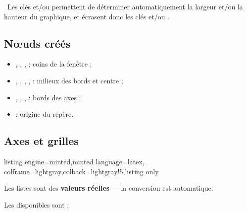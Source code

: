 \documentclass[11pt,a4paper]{ltxdoc}
\begin{document}
\smallskip

{\footnotesize\faBomb}~Les clés  et/ou  permettent de déterminer automatiquement la largeur et/ou la hauteur du graphique, et écrasent donc les clés  et/ou .

\subsection{Nœuds créés}

\begin{itemize}
	\item {}, , ,  : coins de la fenêtre ;
	\item {}, , , ,  : milieux des bords et centre ;
	\item {}, , ,  : bords des axes ;
	\item {} : origine du repère.
\end{itemize}

\pagebreak

\subsection{Axes et grilles}

\begin{tcblisting}{listing engine=minted,minted language=latex,
  colframe=lightgray,colback=lightgray!5,listing only}
\end{tcblisting}

Les listes sont des \textbf{valeurs réelles} — la conversion est automatique.

\smallskip

Les \MontreCode{[clés]} disponibles sont :
\end{document}
